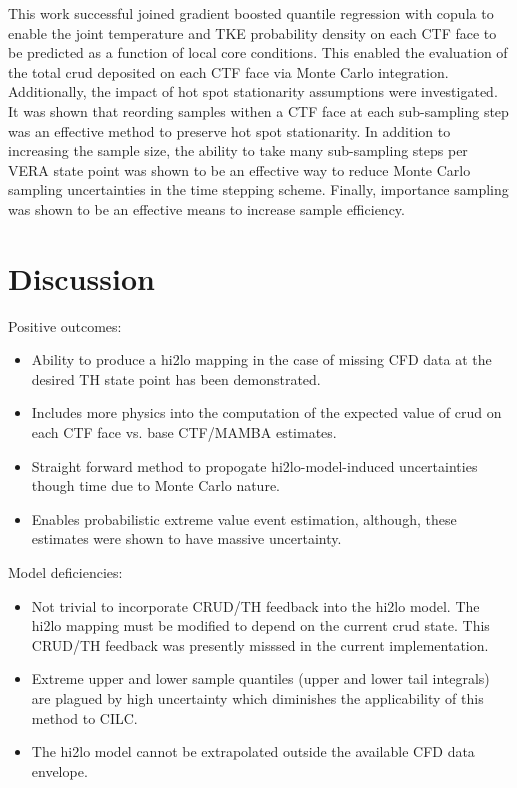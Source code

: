 
This work successful joined gradient boosted quantile regression with copula to enable the joint temperature and TKE probability density on each CTF face to be predicted as a function of local core conditions.  This enabled the evaluation of the total crud deposited on each CTF face via Monte Carlo integration.  Additionally, the impact of hot spot stationarity assumptions were investigated.  It was shown that reording samples withen a CTF face at each sub-sampling step was an effective method to preserve hot spot stationarity.  In addition to increasing the sample size, the ability to take many sub-sampling steps per VERA state point was shown to be an effective way to reduce Monte Carlo sampling uncertainties in the time stepping scheme.  Finally, importance sampling was shown to be an effective means to increase sample efficiency.

\section{Discussion}

Positive outcomes:

\begin{itemize}
	\item  Ability to produce a hi2lo mapping in the case of missing CFD data at the desired TH state point has been demonstrated.
	\item  Includes more physics into the computation of the expected value of crud on each CTF face vs. base CTF/MAMBA estimates.
	\item  Straight forward method to propogate hi2lo-model-induced uncertainties though time due to Monte Carlo nature.
	\item  Enables probabilistic extreme value event estimation, although, these estimates were shown to have massive uncertainty.
\end{itemize}

\noindent Model deficiencies:  

\begin{itemize}
	\item  Not trivial to incorporate CRUD/TH feedback into the hi2lo model.  The hi2lo mapping must be modified to depend on the current crud state.  This CRUD/TH feedback was presently misssed in the current implementation.
	\item  Extreme upper and lower sample quantiles (upper and lower tail integrals) are plagued by high uncertainty which diminishes the applicability of this method to CILC.  
    \item  The hi2lo model cannot be extrapolated outside the available CFD data envelope.
\end{itemize}

